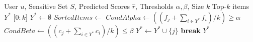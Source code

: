\begin{algorithm}[!ht]
\caption{Algoritma Re-ranking (diadaptasi dari \textcite{DeBiasio2023})}
\label{alg:reranking_debiasio}
\begin{algorithmic}[1]
\Require User $u$, Sensitive Set $S$, Predicted Scores $\hat{r}$, Thresholds $\alpha, \beta$, Size $k$
\Ensure Top-$k$ items $Y^*$
    \State \Return {}[$0:k$]
\Else
    \State $Y^* \gets \emptyset$
    \State $SortedItems \gets$ 
            \State $CondAlpha \gets ((f_j + \sum_{i \in Y^*} f_i) / k) \geq \alpha$
            \State $CondBeta \gets ((c_j + \sum_{i \in Y^*} c_i) / k) \leq \beta$
                \State $Y^* \gets Y^* \cup \{j\}$
            \EndIf
        \Else
            \State \textbf{break}
        \EndIf
    \EndFor
    \State \Return $Y^*$
\EndIf
\end{algorithmic}
\end{algorithm}